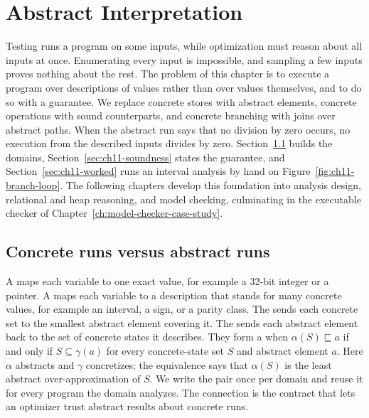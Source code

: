 \chapter{Abstract Interpretation}
\label{ch:ch11-abstract-interpretation}

Testing runs a program on some inputs, while optimization must reason about all inputs at once.
Enumerating every input is impossible, and sampling a few inputs proves nothing about the rest.
The problem of this chapter is to execute a program over descriptions of values rather than over values themselves, and to do so with a guarantee.
We replace concrete stores with abstract elements, concrete operations with sound counterparts, and concrete branching with joins over abstract paths.
When the abstract run says that no division by zero occurs, no execution from the described inputs divides by zero.
Section~\ref{sec:ch11-domains} builds the domains, Section~\ref{sec:ch11-soundness} states the guarantee, and Section~\ref{sec:ch11-worked} runs an interval analysis by hand on Figure~\ref{fig:ch11-branch-loop}.
The following chapters develop this foundation into analysis design, relational and heap reasoning, and model checking, culminating in the executable checker of Chapter~\ref{ch:model-checker-case-study}.

\section{Concrete runs versus abstract runs}
\label{sec:ch11-domains}

A  maps each variable to one exact value, for example a 32-bit integer or a pointer.
A  maps each variable to a description that stands for many concrete values, for example an interval, a sign, or a parity class.
The  sends each concrete set to the smallest abstract element covering it.
The  sends each abstract element back to the set of concrete states it describes.
They form a  when $\alpha(S)\sqsubseteq a$ if and only if $S\subseteq\gamma(a)$ for every concrete-state set $S$ and abstract element $a$.
Here $\alpha$ abstracts and $\gamma$ concretizes; the equivalence says that $\alpha(S)$ is the least abstract over-approximation of $S$.
We write the pair once per domain and reuse it for every program the domain analyzes.
The connection is the contract that lets an optimizer trust abstract results about concrete runs.

